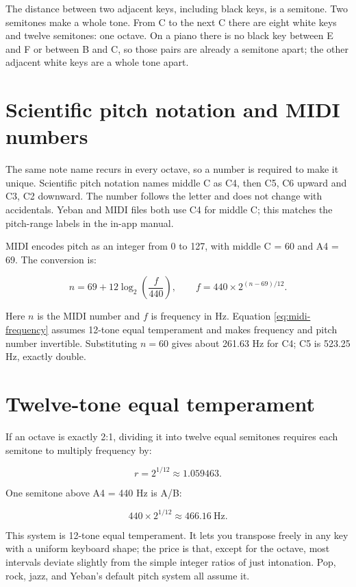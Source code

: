 The distance between two adjacent keys, including black keys, is a semitone. Two semitones make a whole tone. From C to the next C there are eight white keys and twelve semitones: one octave. On a piano there is no black key between E and F or between B and C, so those pairs are already a semitone apart; the other adjacent white keys are a whole tone apart.

\section{Scientific pitch notation and MIDI numbers}

The same note name recurs in every octave, so a number is required to make it unique. Scientific pitch notation names middle C as C4, then C5, C6 upward and C3, C2 downward. The number follows the letter and does not change with accidentals. Yeban and MIDI files both use C4 for middle C; this matches the pitch-range labels in the in-app manual.

MIDI encodes pitch as an integer from 0 to 127, with middle C = 60 and A4 = 69. The conversion is:

\begin{equation}
  n = 69 + 12\log_2\!\left(\frac{f}{440}\right),
  \qquad
  f = 440 \times 2^{(n-69)/12}.
  \label{eq:midi-frequency}
\end{equation}

Here \(n\) is the MIDI number and \(f\) is frequency in Hz. Equation \eqref{eq:midi-frequency} assumes 12-tone equal temperament and makes frequency and pitch number invertible. Substituting \(n=60\) gives about 261.63 Hz for C4; C5 is 523.25 Hz, exactly double.

\section{Twelve-tone equal temperament}

If an octave is exactly 2:1, dividing it into twelve equal semitones requires each semitone to multiply frequency by:

\begin{equation}
  r = 2^{1/12} \approx 1.059463.
  \label{eq:semitone-ratio}
\end{equation}

One semitone above A4 = 440 Hz is A/B:

\[
  440 \times 2^{1/12} \approx 466.16\ \text{Hz}.
\]

This system is 12-tone equal temperament. It lets you transpose freely in any key with a uniform keyboard shape; the price is that, except for the octave, most intervals deviate slightly from the simple integer ratios of just intonation. Pop, rock, jazz, and Yeban's default pitch system all assume it.

